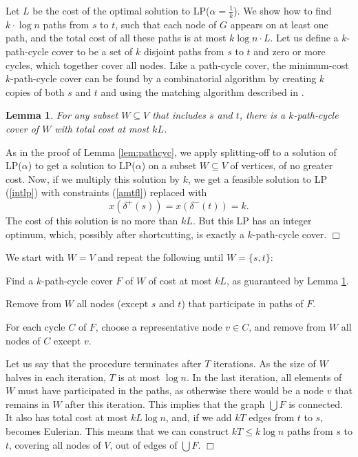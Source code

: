 \documentclass[11pt]{article}
\newcommand{\qed}{\hspace*{\fill}$\Box$}
\newtheorem{lemma}[theorem]{Lemma}
\newenvironment{proof}[1][Proof. ]{\noindent {\bf #1 }}{\qed}
\newenvironment{proofof}[1]{\medskip \noindent {\bf{Proof of #1. }}}{\qed}
\begin{document}
Let $L$ be the cost of the optimal solution to LP($\alpha = \frac{1}{k}$). We show 
how to find $k\cdot \log n$ paths from $s$ to $t$, such that each node of $G$ appears on at least 
one path, and the total cost of all these paths is at most $k \log n \cdot L$. Let us define a 
$k$-path-cycle cover to be a set of $k$ disjoint 
paths from $s$ to $t$ and zero or more cycles, which together cover all nodes. 
Like a path-cycle cover, the minimum-cost $k$-path-cycle cover can be found by a combinatorial algorithm
by creating $k$ copies of both $s$ and $t$ and using the matching algorithm described in \cite{lam:newman}.

\begin{lemma} \label{lem:kpathcyc}
For any subset $W\subseteq V$ that includes $s$ and $t$, there is a 
$k$-path-cycle cover of $W$ with total cost at most $k L$.
\end{lemma}
\begin{proof}
As in the proof of Lemma \ref{lem:pathcyc}, we apply splitting-off to a solution of LP($\alpha$) to get a solution to LP($\alpha$) on a subset $W\subseteq V$ of vertices, of 
no greater cost. Now, if we multiply this solution by $k$, we get a feasible solution to 
LP (\ref{intlp}) with constraints (\ref{amtfl}) replaced with 
$$x(\delta^+(s))=x(\delta^-(t))=k.$$
The cost of this solution is no more than $kL$. 
But this LP has an integer optimum, which, possibly after shortcutting, is exactly a $k$-path-cycle cover. 
\end{proof}



\begin{proofof}{Theorem \ref{thm:kpath}}
We start with $W=V$ and repeat the following until $W=\{s,t\}$: 
\begin{compactenum}
\item
Find a $k$-path-cycle cover $F$ of $W$ of cost at most $kL$, as guaranteed by Lemma \ref{lem:kpathcyc}.
\item
Remove from $W$ all nodes (except $s$ and $t$) that participate in paths of $F$.
\item
For each cycle $C$ of $F$, choose a representative node $v\in C$, and remove from $W$ all nodes of $C$ except $v$.
\end{compactenum}

\noindent
Let us say that the procedure terminates after $T$ iterations. As the size of $W$ halves in each iteration, 
$T$ is at most $\log n$. In the last iteration, all elements of $W$ must have participated in the paths, 
as otherwise there would be a node $v$ that remains in $W$ after this iteration. This implies that the graph 
$\bigcup F$ is connected. It also has total cost at most $kL \log n$, and, if we add $kT$ edges from $t$ to 
$s$, becomes Eulerian. This means that we can construct 
$kT\leq k\log n$ paths from $s$ to $t$, covering all nodes of $V$, out of edges of $\bigcup F$. 
\end{proofof}
\end{document}
